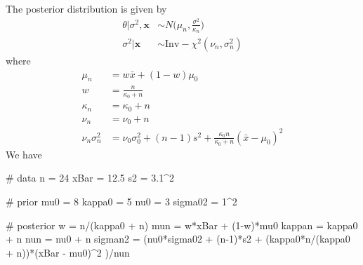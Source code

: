 \documentclass[
  letterpaper,
  DIV=11,
  numbers=noendperiod]{scrartcl}
\newenvironment{Shaded}{\begin{snugshade}}{\end{snugshade}}
\newcommand{\CommentTok}[1]{\textcolor[rgb]{0.37,0.37,0.37}{#1}}
\newcommand{\DecValTok}[1]{\textcolor[rgb]{0.68,0.00,0.00}{#1}}
\newcommand{\FloatTok}[1]{\textcolor[rgb]{0.68,0.00,0.00}{#1}}
\newcommand{\NormalTok}[1]{\textcolor[rgb]{0.00,0.23,0.31}{#1}}
\newcommand{\OtherTok}[1]{\textcolor[rgb]{0.00,0.23,0.31}{#1}}
\newcommand{\SpecialCharTok}[1]{\textcolor[rgb]{0.37,0.37,0.37}{#1}}
\begin{document}
\begin{tcolorbox}[enhanced jigsaw, title={Solution}, bottomtitle=1mm, opacityback=0, colback=white, colbacktitle=quarto-callout-note-color!10!white, breakable, left=2mm, colframe=quarto-callout-note-color-frame, coltitle=black, bottomrule=.15mm, leftrule=.75mm, toptitle=1mm, titlerule=0mm, arc=.35mm, rightrule=.15mm, opacitybacktitle=0.6, toprule=.15mm]

The posterior distribution is given by \[
\begin{aligned}
\theta | \sigma^2 , \boldsymbol{x} &\sim N\Big(\mu_n,\frac{\sigma^2}{\kappa_n}\Big) \\
\sigma^2 | \boldsymbol{x} &\sim \mathrm{Inv-}\chi^2(\nu_n,\sigma_n^2)
\end{aligned}
\] where \[
\begin{aligned}
\mu_n &= w \bar x + (1-w)\mu_0 \\
w &= \frac{n}{\kappa_0+n} \\
\kappa_n &= \kappa_0 + n \\
\nu_n &= \nu_0 + n  \\
\nu_n\sigma_n^2 &= \nu_0\sigma_0^2 + (n-1)s^2 + \frac{\kappa_0 n}{\kappa_0+n}(\bar x -\mu_0)^2
\end{aligned}
\] We have

\begin{Shaded}
\begin{Highlighting}[]
\CommentTok{\# data }
\NormalTok{n }\OtherTok{=} \DecValTok{24}
\NormalTok{xBar }\OtherTok{=} \FloatTok{12.5}
\NormalTok{s2 }\OtherTok{=} \FloatTok{3.1}\SpecialCharTok{\^{}}\DecValTok{2}

\CommentTok{\# prior}
\NormalTok{mu0 }\OtherTok{=} \DecValTok{8}
\NormalTok{kappa0 }\OtherTok{=} \DecValTok{5}
\NormalTok{nu0 }\OtherTok{=} \DecValTok{3}
\NormalTok{sigma02 }\OtherTok{=} \DecValTok{1}\SpecialCharTok{\^{}}\DecValTok{2}

\CommentTok{\# posterior}
\NormalTok{w }\OtherTok{=}\NormalTok{ n}\SpecialCharTok{/}\NormalTok{(kappa0 }\SpecialCharTok{+}\NormalTok{ n)}
\NormalTok{mun }\OtherTok{=}\NormalTok{ w}\SpecialCharTok{*}\NormalTok{xBar }\SpecialCharTok{+}\NormalTok{ (}\DecValTok{1}\SpecialCharTok{{-}}\NormalTok{w)}\SpecialCharTok{*}\NormalTok{mu0}
\NormalTok{kappan }\OtherTok{=}\NormalTok{ kappa0 }\SpecialCharTok{+}\NormalTok{ n}
\NormalTok{nun }\OtherTok{=}\NormalTok{ nu0 }\SpecialCharTok{+}\NormalTok{ n}
\NormalTok{sigman2 }\OtherTok{=}\NormalTok{ (nu0}\SpecialCharTok{*}\NormalTok{sigma02 }\SpecialCharTok{+}\NormalTok{ (n}\DecValTok{{-}1}\NormalTok{)}\SpecialCharTok{*}\NormalTok{s2  }\SpecialCharTok{+} 
\NormalTok{             (kappa0}\SpecialCharTok{*}\NormalTok{n}\SpecialCharTok{/}\NormalTok{(kappa0 }\SpecialCharTok{+}\NormalTok{ n))}\SpecialCharTok{*}\NormalTok{(xBar }\SpecialCharTok{{-}}\NormalTok{ mu0)}\SpecialCharTok{\^{}}\DecValTok{2}\NormalTok{ )}\SpecialCharTok{/}\NormalTok{nun}
\end{Highlighting}
\end{Shaded}


\end{tcolorbox}
\end{document}
